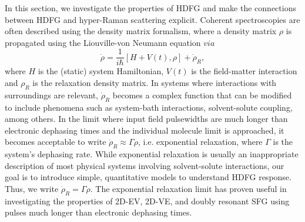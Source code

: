 \documentclass[aip, jcp, reprint, onecolumn, nofootinbib]{revtex4-2}
\begin{document}
In this section, we investigate the properties of HDFG and make the connections between HDFG and hyper-Raman scattering explicit.
Coherent spectroscopies are often described using the density matrix formalism, where a density matrix $\rho$ is propagated using the Liouville-von Neumann equation $via$
\begin{equation}\label{LVNE}
	\dot{\rho} = \frac{1}{i \hbar} [H + V(t), \rho] + \dot{\rho}_R,
\end{equation}
where $H$ is the (static) system Hamiltonian, $V(t)$ is the field-matter interaction and $\rho_R$ is the relaxation density matrix. \cite{RN455}
In systems where interactions with surroundings are relevant, $\dot{\rho}_R$ becomes a complex function that can be modified to include phenomena such as system-bath interactions, solvent-solute coupling, among others. \cite{Sung2001}
In the limit where input field pulsewidths are much longer than electronic dephasing times and the individual molecule limit is approached, it becomes acceptable to write $\dot{\rho}_R \approx \Gamma \rho$, i.e. exponential relaxation, where $\Gamma$ is the system's dephasing rate. \cite{RN455, Sung2001}
While exponential relaxation is usually an inappropriate description of most physical systems involving solvent-solute interactions,\cite{Yan1988, Li1994, Myers1997} our goal is to introduce simple, quantitative models to understand HDFG response.
Thus, we write $\dot{\rho}_R = \Gamma \rho$.
The exponential relaxation limit has proven useful in investigating the properties of 2D-EV, 2D-VE, and doubly resonant SFG using pulses much longer than electronic dephasing times. \cite{Raschke2002, Gaynor2017}
\end{document}
